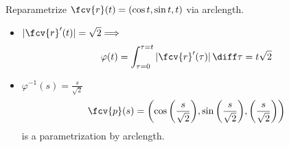 \begin{frame}
\begin{example}
Reparametrize $\fcv{r}(t) = ( \cos{t}, \sin{t}, t)$ via arclength.

\begin{itemize}
\item<2-> $|\fcv{r}'(t)| = \sqrt{2} \Longrightarrow $
$$\varphi(t) = \int_{\tau=0}^{\tau=t}|\fcv{r}'(\tau)|\, \diff\tau =  t\sqrt{2}$$
\item<3-> $\varphi^{-1}(s) = \frac{s}{\sqrt{2}}$
\[
\fcv{p}(s) = \left( \cos{\left( \frac{s}{\sqrt{2}} \right)}, \sin{\left( \frac{s}{\sqrt{2}} \right)}, \left( \frac{s}{\sqrt{2}} \right) \right)
\]
is a parametrization by arclength.
\end{itemize}
\end{example}
\end{frame}
